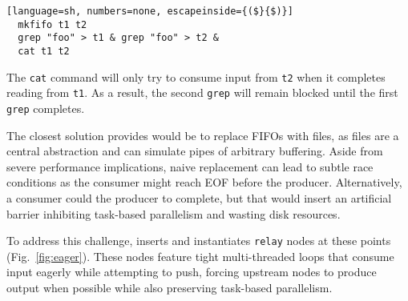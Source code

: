 \documentclass[letterpaper,twocolumn,10pt]{article}
\newcommand{\ttt}[1]{\texttt{#1}}
\newcommand{\TODO}[1]{\hl{\textbf{TODO:} #1}\xspace}
\begin{document}
\begin{lstlisting}[language=sh, numbers=none, escapeinside={($}{$)}]
  mkfifo t1 t2
  grep "foo" > t1 & grep "foo" > t2 &
  cat t1 t2
\end{lstlisting}

\noindent
The \ttt{cat} command will only try to consume input from \ttt{t2} when it completes reading from \ttt{t1}.
As a result, the second \ttt{grep} will remain blocked until the first \ttt{grep} completes. %

The closest solution \unix provides would be to replace FIFOs with files, as files are a central abstraction and can simulate pipes of arbitrary buffering.
Aside from severe performance implications, naive replacement can lead to subtle race conditions as the consumer might reach EOF before the producer.
Alternatively, a consumer could the producer to complete, but that would insert an artificial barrier inhibiting task-based parallelism and wasting disk resources.

To address this challenge,
  \sys inserts and instantiates \ttt{relay} nodes at these points (Fig.~\ref{fig:eager}). %
These nodes feature tight multi-threaded loops that consume input eagerly while attempting to push, forcing upstream nodes to produce output when possible while also preserving task-based parallelism.


\end{document}
